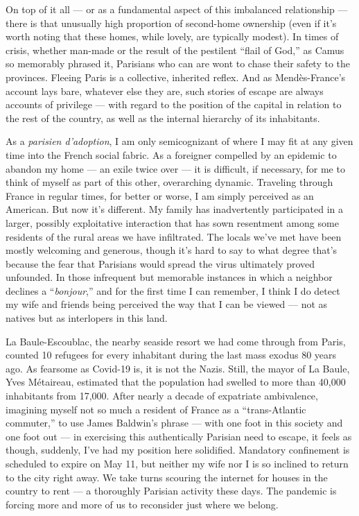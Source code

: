 On top of it all --- or as a fundamental aspect of this imbalanced
relationship --- there is that unusually high proportion of second-home
ownership (even if it's worth noting that these homes, while lovely, are
typically modest). In times of crisis, whether man-made or the result of
the pestilent ``flail of God,'' as Camus so memorably phrased it,
Parisians who can are wont to chase their safety to the provinces.
Fleeing Paris is a collective, inherited reflex. And as Mendès-France's
account lays bare, whatever else they are, such stories of escape are
always accounts of privilege --- with regard to the position of the
capital in relation to the rest of the country, as well as the internal
hierarchy of its inhabitants.

As a \emph{parisien d'adoption}, I am only semicognizant of where I may
fit at any given time into the French social fabric. As a foreigner
compelled by an epidemic to abandon my home --- an exile twice over ---
it is difficult, if necessary, for me to think of myself as part of this
other, overarching dynamic. Traveling through France in regular times,
for better or worse, I am simply perceived as an American. But now it's
different. My family has inadvertently participated in a larger,
possibly exploitative interaction that has sown resentment among some
residents of the rural areas we have infiltrated. The locals we've met
have been mostly welcoming and generous, though it's hard to say to what
degree that's because the fear that Parisians would spread the virus
ultimately proved unfounded. In those infrequent but memorable instances
in which a neighbor declines a ``\emph{bonjour},'' and for the first
time I can remember, I think I do detect my wife and friends being
perceived the way that I can be viewed --- not as natives but as
interlopers in this land.

La Baule-Escoublac, the nearby seaside resort we had come through from
Paris, counted 10 refugees for every inhabitant during the last mass
exodus 80 years ago. As fearsome as Covid-19 is, it is not the Nazis.
Still, the mayor of La Baule, Yves Métaireau, estimated that the
population had swelled to more than 40,000 inhabitants from 17,000.
After nearly a decade of expatriate ambivalence, imagining myself not so
much a resident of France as a ``trans-Atlantic commuter,'' to use James
Baldwin's phrase --- with one foot in this society and one foot out ---
in exercising this authentically Parisian need to escape, it feels as
though, suddenly, I've had my position here solidified. Mandatory
confinement is scheduled to expire on May 11, but neither my wife nor I
is so inclined to return to the city right away. We take turns scouring
the internet for houses in the country to rent --- a thoroughly Parisian
activity these days. The pandemic is forcing more and more of us to
reconsider just where we belong.

